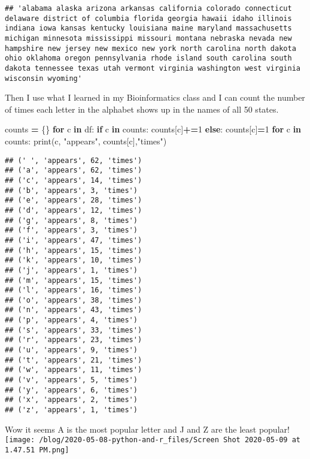 \documentclass[]{article}
\newenvironment{Shaded}{\begin{snugshade}}{\end{snugshade}}
\newcommand{\BuiltInTok}[1]{#1}
\newcommand{\ControlFlowTok}[1]{\textcolor[rgb]{0.13,0.29,0.53}{\textbf{#1}}}
\newcommand{\DecValTok}[1]{\textcolor[rgb]{0.00,0.00,0.81}{#1}}
\newcommand{\KeywordTok}[1]{\textcolor[rgb]{0.13,0.29,0.53}{\textbf{#1}}}
\newcommand{\NormalTok}[1]{#1}
\newcommand{\OperatorTok}[1]{\textcolor[rgb]{0.81,0.36,0.00}{\textbf{#1}}}
\newcommand{\StringTok}[1]{\textcolor[rgb]{0.31,0.60,0.02}{#1}}
\begin{document}
\begin{verbatim}
## 'alabama alaska arizona arkansas california colorado connecticut delaware district of columbia florida georgia hawaii idaho illinois indiana iowa kansas kentucky louisiana maine maryland massachusetts michigan minnesota mississippi missouri montana nebraska nevada new hampshire new jersey new mexico new york north carolina north dakota ohio oklahoma oregon pennsylvania rhode island south carolina south dakota tennessee texas utah vermont virginia washington west virginia wisconsin wyoming'
\end{verbatim}

Then I use what I learned in my Bioinformatics class and I can count the
number of times each letter in the alphabet shows up in the names of all
50 states.

\begin{Shaded}
\begin{Highlighting}[]
\NormalTok{counts }\OperatorTok{=}\NormalTok{ \{\}            }
\ControlFlowTok{for}\NormalTok{ c }\KeywordTok{in}\NormalTok{ df:     }
    \ControlFlowTok{if}\NormalTok{ c }\KeywordTok{in}\NormalTok{ counts:    }
\NormalTok{        counts[c]}\OperatorTok{+=}\DecValTok{1}   
    \ControlFlowTok{else}\NormalTok{:}
\NormalTok{        counts[c]}\OperatorTok{=}\DecValTok{1}    
\ControlFlowTok{for}\NormalTok{ c }\KeywordTok{in}\NormalTok{ counts:}
    \BuiltInTok{print}\NormalTok{(c, }\StringTok{"appears"}\NormalTok{, counts[c],}\StringTok{"times"}\NormalTok{)}
\end{Highlighting}
\end{Shaded}

\begin{verbatim}
## (' ', 'appears', 62, 'times')
## ('a', 'appears', 62, 'times')
## ('c', 'appears', 14, 'times')
## ('b', 'appears', 3, 'times')
## ('e', 'appears', 28, 'times')
## ('d', 'appears', 12, 'times')
## ('g', 'appears', 8, 'times')
## ('f', 'appears', 3, 'times')
## ('i', 'appears', 47, 'times')
## ('h', 'appears', 15, 'times')
## ('k', 'appears', 10, 'times')
## ('j', 'appears', 1, 'times')
## ('m', 'appears', 15, 'times')
## ('l', 'appears', 16, 'times')
## ('o', 'appears', 38, 'times')
## ('n', 'appears', 43, 'times')
## ('p', 'appears', 4, 'times')
## ('s', 'appears', 33, 'times')
## ('r', 'appears', 23, 'times')
## ('u', 'appears', 9, 'times')
## ('t', 'appears', 21, 'times')
## ('w', 'appears', 11, 'times')
## ('v', 'appears', 5, 'times')
## ('y', 'appears', 6, 'times')
## ('x', 'appears', 2, 'times')
## ('z', 'appears', 1, 'times')
\end{verbatim}

Wow it seems A is the most popular letter and J and Z are the least
popular!
\texttt{[image: /blog/2020-05-08-python-and-r\_files/Screen Shot 2020-05-09 at 1.47.51 PM.png]}
\end{document}
